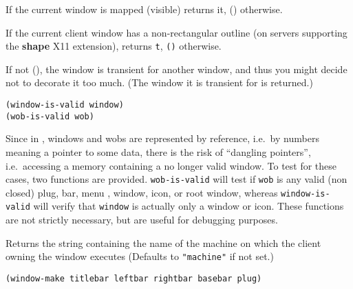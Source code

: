         

If the current window is mapped (visible) returns it, () otherwise.

        

If the current client window has a non-rectangular outline (on servers
supporting the {\bf shape} X11 extension), returns \verb"t", \verb"()"
otherwise.

        

If not (), the window is transient for another window, and thus you might
decide not to decorate it too much. (The window it is transient for is
returned.)


{\usagefont\begin{verbatim}
(window-is-valid window)
(wob-is-valid wob)
\end{verbatim}}\usageupspace

Since in {\GWM}, windows and wobs are represented by reference, i.e.\ by
numbers meaning a pointer to some data, there is the risk of ``dangling
pointers'', i.e.\ accessing a memory containing a no longer valid window. To
test for these cases, two functions are provided. \verb|wob-is-valid| will
test if \verb|wob| is any valid (non closed) plug, bar, menu , window, icon,
or root window, whereas \verb|window-is-valid| will verify that \verb|window|
is actually only a window or icon. These functions are not strictly necessary,
but are useful for debugging purposes.

        

Returns the string containing the name of the machine on which the client
owning the window executes (Defaults to \verb|"machine"| if not set.)

        
{\usagefont\begin{verbatim}
(window-make titlebar leftbar rightbar basebar plug)
\end{verbatim}}\usageupspace

